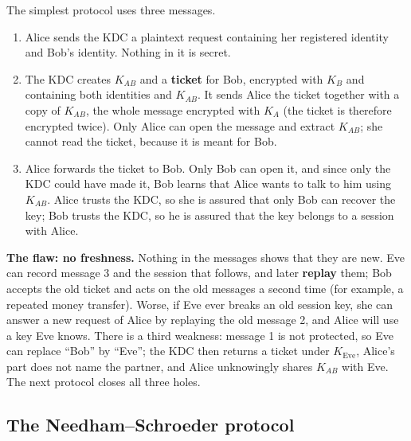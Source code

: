 The simplest protocol uses three messages.
\begin{center}
\end{center}
\begin{enumerate}
  \item Alice sends the KDC a plaintext request containing her registered identity and Bob's identity. Nothing in it is secret.
  \item The KDC creates $K_{AB}$ and a \textbf{ticket} for Bob, encrypted with $K_B$ and containing both identities and $K_{AB}$. It sends Alice the ticket together with a copy of $K_{AB}$, the whole message encrypted with $K_A$ (the ticket is therefore encrypted twice). Only Alice can open the message and extract $K_{AB}$; she cannot read the ticket, because it is meant for Bob.
  \item Alice forwards the ticket to Bob. Only Bob can open it, and since only the KDC could have made it, Bob learns that Alice wants to talk to him using $K_{AB}$. Alice trusts the KDC, so she is assured that only Bob can recover the key; Bob trusts the KDC, so he is assured that the key belongs to a session with Alice.
\end{enumerate}
\textbf{The flaw: no freshness.} Nothing in the messages shows that they are new. Eve can record message 3 and the session that follows, and later \textbf{replay} them; Bob accepts the old ticket and acts on the old messages a second time (for example, a repeated money transfer). Worse, if Eve ever breaks an old session key, she can answer a new request of Alice by replaying the old message 2, and Alice will use a key Eve knows. There is a third weakness: message 1 is not protected, so Eve can replace ``Bob'' by ``Eve''; the KDC then returns a ticket under $K_{\text{Eve}}$, Alice's part does not name the partner, and Alice unknowingly shares $K_{AB}$ with Eve. The next protocol closes all three holes.

\subsection{The Needham--Schroeder protocol \new}

